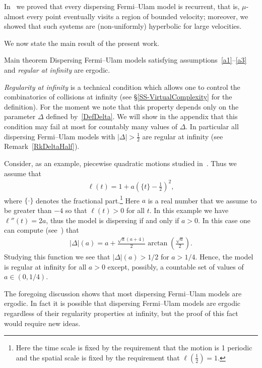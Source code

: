 \documentclass[10pt]{amsart}
\theoremstyle{definition}\newtheorem{defi}[theo]{Definition}\newtheorem{rema}[theo]{Remark}\newtheorem{exam}[theo]{Example}\newtheorem{exem}[theo]{Example}\newtheorem{nota}[theo]{Notation}
\newcommand{\ifrac}[2]{#1/#2}
\begin{document}
In~\cite{fum} we proved that every dispersing Fermi--Ulam model is recurrent, that is, $\mu$-almost every point eventually visits a region of bounded velocity; moreover, we showed that such systems are (non-uniformly) hyperbolic for large velocities.

We now state the main result of the present work.


\begin{enonce*}[plain]{Main theorem}
Dispersing Fermi--Ulam models satisfying assumptions~\eqref{a1}--\eqref{a3} and
\emph{regular at infinity} are ergodic.
\end{enonce*}



\emph{Regularity at infinity} is a technical condition which allows one to control the combinatorics of collisions at infinity (see
\S\ref{SS-VirtualComplexity} for the definition). For the moment we note that this property depends only on the parameter $\Delta$ defined by~\eqref{DefDelta}. We will show in the appendix that this condition may fail at most for countably many values of $\Delta$. In particular all dispersing Fermi--Ulam models with $|\Delta|>\frac{1}{2}$ are regular at infinity (see Remark~\ref{RkDeltaHalf}).

Consider, as an example, piecewise quadratic motions studied in~\cite{U}. Thus we assume that
\begin{align*}
\ell(t)=1+a \left(\{t\}-\frac{1}{2}\right)^2,
\end{align*}
where $\{\cdot\}$ denotes the fractional part.\footnote{Here the time scale is fixed by the requirement that the motion is 1 periodic and the spatial scale is fixed by the requirement that $\ell(\frac{1}{2})=1.$} Here $a$ is a real number that we assume to be greater than $-4$ so that $\ell(t)>0$ for all $t$. In this example we have $\ell''(t) = 2a$, thus the model is dispersing if and only if $a>0$. In this case one can compute (see~\cite[Example~1.1]{fum}) that
\begin{align*}
|\Delta|(a)=a+\frac{\sqrt{a} (a+4)}{2} \arctan\left(\frac{\sqrt{a}}{2}\right).
\end{align*}
Studying this function we see that $|\Delta|(a)>\ifrac{1}{2}$ for $a>\ifrac{1}{4}$. Hence, the model is regular at infinity for all $a>0$ except, possibly, a countable set of values of $ a\in \left(0, \ifrac{1}{4}\right).$

The foregoing discussion shows that most dispersing Fermi--Ulam models are ergodic. In fact it is possible that dispersing Fermi--Ulam models are ergodic regardless of their regularity properties at infinity, but the proof of this fact would require new ideas.
\end{document}
